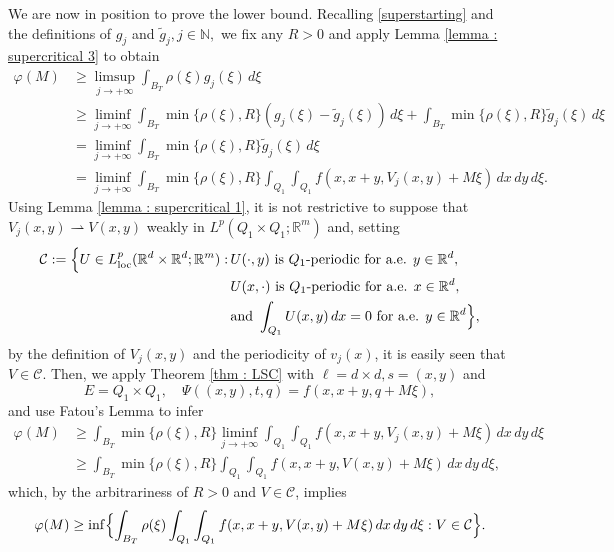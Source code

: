\documentclass{article}
\theoremstyle{definition}
\newcommand{\f}{\varphi}
\newcommand{\N}{\mathbb{N}}
\newcommand{\R}{\mathbb{R}}
\begin{document}
We are now in position to prove the lower bound. Recalling \eqref{superstarting} and the definitions of $g_j$ and $\widetilde{g}_j, j\in\N,$ we fix any $R>0$ and apply Lemma \ref{lemma : supercritical 3} to obtain
\begin{align*}
    \f(M) & \geq \limsup_{j\to+\infty} \int_{B_T} \rho(\xi)g_j(\xi)\,d\xi \\
    & \geq \liminf_{j\to+\infty} \int_{B_T} \min\{\rho(\xi),R\}(g_j(\xi)-\widetilde{g}_j(\xi))\,d\xi + \int_{B_T} \min\{\rho(\xi),R\}\widetilde{g}_j(\xi)\,d\xi \\
    & = \liminf_{j\to+\infty}  \int_{B_T} \min\{\rho(\xi),R\}\widetilde{g}_j(\xi)\,d\xi \\
    & = \liminf_{j\to+\infty}  \int_{B_T} \min\{\rho(\xi),R\} \int_{Q_1} \int_{Q_1} f(x,x+y,V_j(x,y)+M\xi)\, dx\, dy \,d\xi.
    \end{align*}
    Using Lemma \ref{lemma : supercritical 1}, it is not restrictive to suppose that $V_j(x,y)\rightharpoonup V(x,y)$ weakly in $L^p(Q_1\times Q_1;\R^m)$ and, setting
\begin{align*}
    \mathcal{C}:=\Bigl\{U\in  L^p_{\text{loc}}(\R^d\times \R^d; \R^m)  :\, & U(\cdot, y) \text{ is } Q_1\text{-periodic for a.e. } y\in \R^d, \\
    & U(x,\cdot) \text{ is } Q_1\text{-periodic for a.e. } x\in \R^d,  \\
    & \text{and } \int_{Q_1}U(x,y)\,dx=0 \text{ for a.e. } y\in \R^d \Bigr\},
\end{align*}
by the definition of $V_j(x,y)$ and the periodicity of $v_j(x)$, it is easily seen that $V\in \mathcal{C}$. Then, we apply Theorem \ref{thm : LSC} with $\ell=d\times d, s=(x,y)$ and
\begin{equation*}
   E=Q_1\times Q_1,  \quad  \Psi((x,y),t,q)=f(x,x+y,q+M\xi),
\end{equation*} and use Fatou's Lemma to infer
\begin{align*}
    \f(M) & \geq \int_{B_T} \min\{\rho(\xi),R\} \liminf_{j\to+\infty}  \int_{Q_1} \int_{Q_1} f(x,x+y,V_j(x,y)+M\xi)\, dx\, dy \,d\xi \\
    & \geq \int_{B_T} \min\{\rho(\xi),R\} \int_{Q_1} \int_{Q_1} f(x,x+y,V(x,y)+M\xi)\, dx\, dy \,d\xi,
\end{align*}
which, by the arbitrariness of $R>0$ and $V\in \mathcal{C}$, implies
\begin{equation*}
    \f(M) \geq \inf\Bigl\{ \int_{B_T} \rho(\xi)\int_{Q_1}\int_{Q_1} f(x,x+y,V(x,y)+M\xi)\, dx\,dy\,d\xi : V\in\mathcal{C}\Bigr\}.
\end{equation*}
\end{document}
